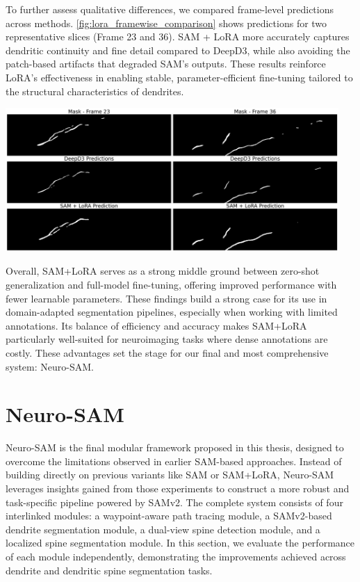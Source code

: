 To further assess qualitative differences, we compared frame-level predictions across methods. \autoref{fig:lora_framewise_comparison} shows predictions for two representative slices (Frame 23 and 36). \gls{SAM} + \gls{LoRA} more accurately captures dendritic continuity and fine detail compared to \gls{DeepD3}, while also avoiding the patch-based artifacts that degraded \gls{SAM}’s outputs. These results reinforce \gls{LoRA}’s effectiveness in enabling stable, parameter-efficient fine-tuning tailored to the structural characteristics of dendrites.

\begin{center}
\includegraphics[width=0.95\textwidth]{figures/29_lora_framewise_comparison.png}
\label{fig:lora_framewise_comparison}
\end{center}

Overall, \gls{SAM}+\gls{LoRA} serves as a strong middle ground between zero-shot generalization and full-model fine-tuning, offering improved performance with fewer learnable parameters. These findings build a strong case for its use in domain-adapted segmentation pipelines, especially when working with limited annotations. Its balance of efficiency and accuracy makes \gls{SAM}+\gls{LoRA} particularly well-suited for neuroimaging tasks where dense annotations are costly. These advantages set the stage for our final and most comprehensive system: Neuro-\gls{SAM}.

\section{Neuro-SAM}
Neuro-\gls{SAM} is the final modular framework proposed in this thesis, designed to overcome the limitations observed in earlier \gls{SAM}-based approaches. Instead of building directly on previous variants like \gls{SAM} or \gls{SAM}+\gls{LoRA}, Neuro-\gls{SAM} leverages insights gained from those experiments to construct a more robust and task-specific pipeline powered by \gls{SAMv2}. The complete system consists of four interlinked modules: a waypoint-aware path tracing module, a \gls{SAMv2}-based dendrite segmentation module, a dual-view spine detection module, and a localized spine segmentation module. In this section, we evaluate the performance of each module independently, demonstrating the improvements achieved across dendrite and dendritic spine segmentation tasks.

